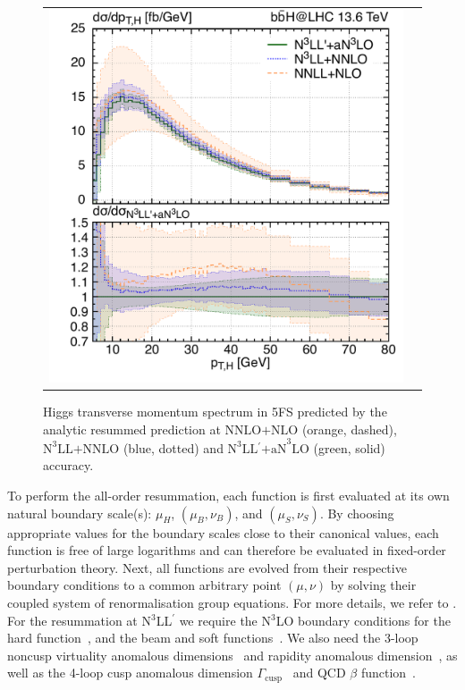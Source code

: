 \documentclass[11pt,a4paper]{article}
\begin{document}
\begin{figure}[t!]
	\begin{center}
		\begin{tabular}{cc}
			\includegraphics[width=.55\textwidth, page=1]{plots/5fs/resummation/ptzoom_Higgs__resum.pdf}
		\end{tabular}
		\vspace*{1ex}
		\caption{Higgs transverse momentum spectrum in 5FS predicted by the analytic resummed prediction at $\text{NNLO+NLO}$ (orange, dashed), $\text{N}^3\text{LL+NNLO}$ (blue, dotted) and $\text{N}^3\text{LL$^{\prime}$+aN}^3\text{LO}$ (green, solid) accuracy.\label{fig:resumplot}}
	\end{center}
\end{figure}
To perform the all-order resummation, each function is first evaluated at its own
natural boundary scale(s): $\mu_H$, $(\mu_B, \nu_B)$, and $(\mu_S, \nu_S)$. By
choosing appropriate values for the boundary scales close to their canonical
values, each function is free of large logarithms and can
therefore be evaluated in fixed-order perturbation theory. Next, all functions are evolved from their respective boundary conditions to a common arbitrary point
$(\mu, \nu)$ by solving their coupled system of renormalisation group equations. For more details, we refer to .
For the resummation at N$^3$LL$^{\prime}$ we require the N$^3$LO
boundary conditions for the hard function~\cite{Gehrmann:2014vha,
	Ebert:2017uel}, and the beam and soft functions~\cite{Lubbert:2016rku,
	Li:2016ctv, Billis:2019vxg, Luo:2019szz, Ebert:2020yqt}. We also need the 3-loop
noncusp virtuality anomalous dimensions~\cite{Lubbert:2016rku, Moch:2005id, Stewart:2010qs,
	Bruser:2018rad, Billis:2019vxg} and rapidity anomalous
dimension~\cite{Lubbert:2016rku, Li:2016ctv, Vladimirov:2016dll}, as well as
the 4-loop cusp anomalous dimension
$\Gamma_\mathrm{cusp}$~\cite{Korchemsky:1987wg, moch:2004pa, Bruser:2019auj,
	Henn:2019swt, vonManteuffel:2020vjv} and QCD $\beta$
function~\cite{Tarasov:1980au, Larin:1993tp, vanRitbergen:1997va,
	Czakon:2004bu}.
\end{document}
